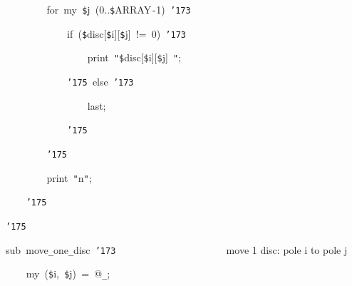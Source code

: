 \documentclass[a4paper,10pt]{article}
\def\mc{\relax}
\begin{document}
\noindent
\mbox{}{\tt\mc \ }{\tt\mc \ }{\tt\mc \ }{\tt\mc \ }{\tt\mc \ }{\tt\mc \ }{\tt\mc \ }{\tt\mc \ }for{\tt\mc \ }my{\tt\mc \ }{\tt\$}j{\tt\mc \ }(0..{\tt\$}ARRAY{\tt -}1){\tt\mc \ }{\tt\char'173}

\noindent
\mbox{}{\tt\mc \ }{\tt\mc \ }{\tt\mc \ }{\tt\mc \ }{\tt\mc \ }{\tt\mc \ }{\tt\mc \ }{\tt\mc \ }{\tt\mc \ }{\tt\mc \ }{\tt\mc \ }{\tt\mc \ }if{\tt\mc \ }({\tt\$}disc[{\tt\$}i][{\tt\$}j]{\tt\mc \ }!={\tt\mc \ }0){\tt\mc \ }{\tt\char'173}

\noindent
\mbox{}{\tt\mc \ }{\tt\mc \ }{\tt\mc \ }{\tt\mc \ }{\tt\mc \ }{\tt\mc \ }{\tt\mc \ }{\tt\mc \ }{\tt\mc \ }{\tt\mc \ }{\tt\mc \ }{\tt\mc \ }{\tt\mc \ }{\tt\mc \ }{\tt\mc \ }{\tt\mc \ }print{\tt\mc \ }{\tt "}{\tt\$}disc[{\tt\$}i][{\tt\$}j]{\tt\mc \ }{\tt "};

\noindent
\mbox{}{\tt\mc \ }{\tt\mc \ }{\tt\mc \ }{\tt\mc \ }{\tt\mc \ }{\tt\mc \ }{\tt\mc \ }{\tt\mc \ }{\tt\mc \ }{\tt\mc \ }{\tt\mc \ }{\tt\mc \ }{\tt\char'175}{\tt\mc \ }else{\tt\mc \ }{\tt\char'173}

\noindent
\mbox{}{\tt\mc \ }{\tt\mc \ }{\tt\mc \ }{\tt\mc \ }{\tt\mc \ }{\tt\mc \ }{\tt\mc \ }{\tt\mc \ }{\tt\mc \ }{\tt\mc \ }{\tt\mc \ }{\tt\mc \ }{\tt\mc \ }{\tt\mc \ }{\tt\mc \ }{\tt\mc \ }last;

\noindent
\mbox{}{\tt\mc \ }{\tt\mc \ }{\tt\mc \ }{\tt\mc \ }{\tt\mc \ }{\tt\mc \ }{\tt\mc \ }{\tt\mc \ }{\tt\mc \ }{\tt\mc \ }{\tt\mc \ }{\tt\mc \ }{\tt\char'175}

\noindent
\mbox{}{\tt\mc \ }{\tt\mc \ }{\tt\mc \ }{\tt\mc \ }{\tt\mc \ }{\tt\mc \ }{\tt\mc \ }{\tt\mc \ }{\tt\char'175}

\noindent
\mbox{}{\tt\mc \ }{\tt\mc \ }{\tt\mc \ }{\tt\mc \ }{\tt\mc \ }{\tt\mc \ }{\tt\mc \ }{\tt\mc \ }print{\tt\mc \ }{\tt "}{\tt{}}n{\tt "};

\noindent
\mbox{}{\tt\mc \ }{\tt\mc \ }{\tt\mc \ }{\tt\mc \ }{\tt\char'175}

\noindent
\mbox{}{\tt\char'175}

\noindent
\mbox{}\hfill

\noindent
\mbox{}sub{\tt\mc \ }move{\tt\_}one{\tt\_}disc{\tt\mc \ }{\tt\char'173}{\tt\mc \ }{\tt\mc \ }{\tt\mc \ }{\tt\mc \ }{\tt\mc \ }{\tt\mc \ }{\tt\mc \ }{\tt\mc \ }{\tt\mc \ }{\tt\mc \ }{\tt\mc \ }{\tt\mc \ }{\tt\mc \ }{\tt\mc \ }{\tt\mc \ }{\tt\mc \ }{\tt\mc \ }{\tt\mc \ }{\tt\mc \ }{\tt\mc \ }{\tt\mc \ }\rm\mc {\tt\#} move 1 disc: pole i to pole j
\tt\mc 

\noindent
\mbox{}{\tt\mc \ }{\tt\mc \ }{\tt\mc \ }{\tt\mc \ }my{\tt\mc \ }({\tt\$}i,{\tt\mc \ }{\tt\$}j){\tt\mc \ }={\tt\mc \ }@{\tt\_};
\end{document}
